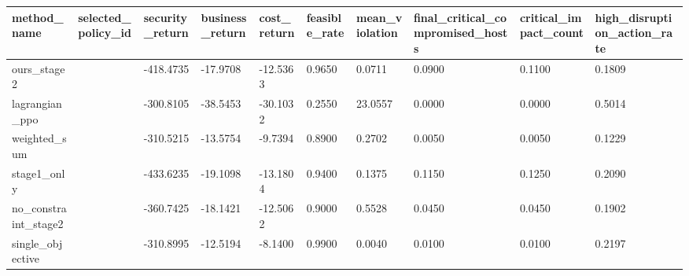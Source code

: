 \begin{tabular}{llllllllll}
\hline
method_name & selected_policy_id & security_return & business_return & cost_return & feasible_rate & mean_violation & final_critical_compromised_hosts & critical_impact_count & high_disruption_action_rate \\
\hline
ours_stage2 &  & -418.4735 & -17.9708 & -12.5363 & 0.9650 & 0.0711 & 0.0900 & 0.1100 & 0.1809 \\
lagrangian_ppo &  & -300.8105 & -38.5453 & -30.1032 & 0.2550 & 23.0557 & 0.0000 & 0.0000 & 0.5014 \\
weighted_sum &  & -310.5215 & -13.5754 & -9.7394 & 0.8900 & 0.2702 & 0.0050 & 0.0050 & 0.1229 \\
stage1_only &  & -433.6235 & -19.1098 & -13.1804 & 0.9400 & 0.1375 & 0.1150 & 0.1250 & 0.2090 \\
no_constraint_stage2 &  & -360.7425 & -18.1421 & -12.5062 & 0.9000 & 0.5528 & 0.0450 & 0.0450 & 0.1902 \\
single_objective &  & -310.8995 & -12.5194 & -8.1400 & 0.9900 & 0.0040 & 0.0100 & 0.0100 & 0.2197 \\
\hline
\end{tabular}